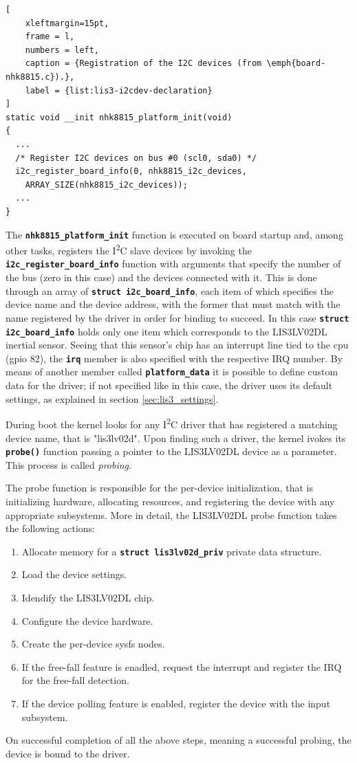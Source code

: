 \documentclass[a4paper,10pt]{article}
\newenvironment{packedenum}{
\begin{enumerate}
  \setlength{\itemsep}{3pt}
  \setlength{\parskip}{0pt}
  \setlength{\parsep}{0pt}
}{\end{enumerate}}
\newcommand{\icc}{I\textsuperscript{2}C }
\newcommand{\keyword}[1]{\texttt{\textbf{#1}}}
\begin{document}
\begin{multicols}{2}
\begin{lstlisting}[
	xleftmargin=15pt,
	frame = l,
	numbers = left,
	caption = {Registration of the I2C devices (from \emph{board-nhk8815.c}).},
	label = {list:lis3-i2cdev-declaration}
]
static void __init nhk8815_platform_init(void)
{
  ...
  /* Register I2C devices on bus #0 (scl0, sda0) */
  i2c_register_board_info(0, nhk8815_i2c_devices,
    ARRAY_SIZE(nhk8815_i2c_devices));
  ...
}
\end{lstlisting}

The \keyword{nhk8815\_platform\_init} function is executed on board startup
and, among other tasks, registers the \icc slave devices by invoking the
\keyword{i2c\_register\_board\_info} function with arguments that specify
the number of the bus (zero in this case) and the devices connected with it.
This is done through an array of \keyword{struct i2c\_board\_info}, each item
of which specifies the device name and the device address, with the former that
must match with the name registered by the driver in order for binding to succeed.
In this case \keyword{struct i2c\_board\_info} holds only one item which
corresponds to the LIS3LV02DL inertial sensor. Seeing that this sensor's chip
has an interrupt line tied to the cpu (gpio 82), the \keyword{irq} member is
also specified with the respective IRQ number. By means of another member
called \keyword{platform\_data} it is possible to define custom data for the
driver; if not specified like in this case, the driver uses its default
settings, as explained in section \ref{sec:lis3_settings}.

During boot the kernel looks for any \icc driver that has registered a matching
device name, that is "lis3lv02d". Upon finding such a driver, the kernel
ivokes its \keyword{probe()} function passing a pointer to the LIS3LV02DL
device as a parameter. This process is called \emph{probing}.

The probe function is responsible for the per-device initialization, that is
initializing hardware, allocating resources, and registering the device with
any appropriate subsystems. More in detail, the LIS3LV02DL probe function
takes the following actions:
\begin{packedenum}
	\item Allocate memory for a \keyword{struct lis3lv02d\_priv} private data
		structure.
	\item Load the device settings.
	\item Idendify the LIS3LV02DL chip.
	\item Configure the device hardware.
	\item Create the per-device sysfs nodes.
	\item If the free-fall feature is enadled, request the interrupt and
		register the IRQ for the free-fall detection.
	\item If the device polling feature is enabled, register the device with
		the input subsystem.
\end{packedenum}
On successful completion of all the above steps, meaning a successful probing,
the device is bound to the driver.



\end{multicols}
\end{document}

